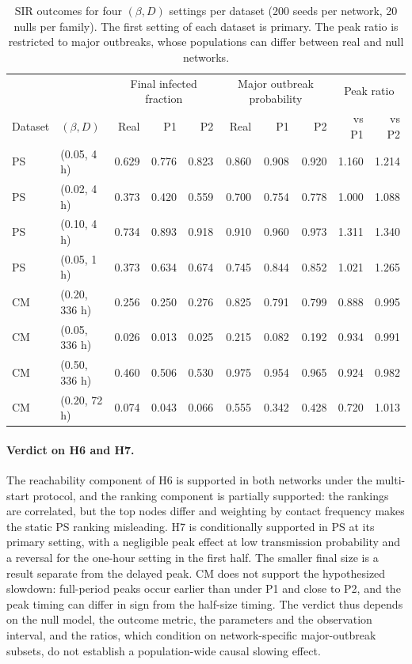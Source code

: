 \begin{table}[t]
\centering\small
\begin{tabular*}{\textwidth}{@{\extracolsep{\fill}}llrrrrrrrr@{}}
\toprule & & \multicolumn{3}{c}{Final infected fraction} & \multicolumn{3}{c}{Major outbreak probability} & \multicolumn{2}{c}{Peak ratio} \\
Dataset & $(\beta,D)$ & Real & P1 & P2 & Real & P1 & P2 & vs P1 & vs P2 \\
\midrule
PS & (0.05, 4 h) & 0.629 & 0.776 & 0.823 & 0.860 & 0.908 & 0.920 & 1.160 & 1.214 \\
PS & (0.02, 4 h) & 0.373 & 0.420 & 0.559 & 0.700 & 0.754 & 0.778 & 1.000 & 1.088 \\
PS & (0.10, 4 h) & 0.734 & 0.893 & 0.918 & 0.910 & 0.960 & 0.973 & 1.311 & 1.340 \\
PS & (0.05, 1 h) & 0.373 & 0.634 & 0.674 & 0.745 & 0.844 & 0.852 & 1.021 & 1.265 \\
CM & (0.20, 336 h) & 0.256 & 0.250 & 0.276 & 0.825 & 0.791 & 0.799 & 0.888 & 0.995 \\
CM & (0.05, 336 h) & 0.026 & 0.013 & 0.025 & 0.215 & 0.082 & 0.192 & 0.934 & 0.991 \\
CM & (0.50, 336 h) & 0.460 & 0.506 & 0.530 & 0.975 & 0.954 & 0.965 & 0.924 & 0.982 \\
CM & (0.20, 72 h) & 0.074 & 0.043 & 0.066 & 0.555 & 0.342 & 0.428 & 0.720 & 1.013 \\
\bottomrule\end{tabular*}
\caption{SIR outcomes for four $(\beta,D)$ settings per dataset (200 seeds per network, 20
nulls per family). The first setting of each dataset is primary. The peak ratio is
restricted to major outbreaks, whose populations can differ between real and null networks.}
\label{tab:d-sir}
\end{table}

\paragraph{Verdict on H6 and H7.}
The reachability component of H6 is supported in both networks under the multi-start
protocol, and the ranking component is partially supported: the rankings are correlated,
but the top nodes differ and weighting by contact frequency makes the static PS ranking
misleading. H7 is conditionally supported in PS at its primary setting, with a negligible
peak effect at low transmission probability and a reversal for the one-hour setting in the
first half. The smaller final size is a result separate from the delayed peak. CM does not
support the hypothesized slowdown: full-period peaks occur earlier than under P1 and close
to P2, and the peak timing can differ in sign from the half-size timing. The verdict thus depends on the null
model, the outcome metric, the parameters and the observation interval, and the ratios,
which condition on network-specific major-outbreak subsets, do not establish a
population-wide causal slowing effect.
